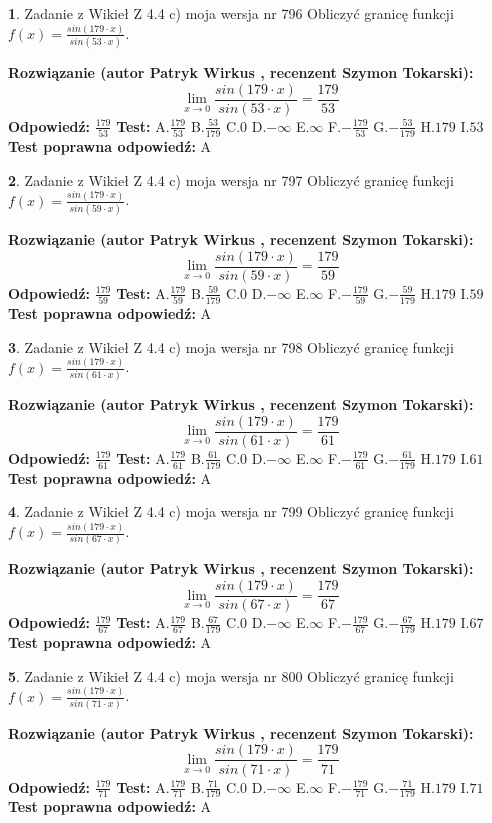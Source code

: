 \documentclass[12pt, a4paper]{article}
\theoremstyle{definition} %
\newtheorem{zad}{}
\newcommand{\zadStart}[1]{\begin{zad}#1\newline}
\newcommand{\zadStop}{\end{zad}}
\newcommand{\rozwStart}[2]{\noindent \textbf{Rozwiązanie (autor #1 , recenzent #2): }\newline}
\newcommand{\rozwStop}{\newline}
\newcommand{\odpStart}{\noindent \textbf{Odpowiedź:}\newline}
\newcommand{\odpStop}{\newline}
\newcommand{\testStart}{\noindent \textbf{Test:}\newline}
\newcommand{\testStop}{\newline}
\newcommand{\kluczStart}{\noindent \textbf{Test poprawna odpowiedź:}\newline}
\newcommand{\kluczStop}{\newline}
\begin{document}
\zadStart{Zadanie z Wikieł Z 4.4 c) moja wersja nr 796}
Obliczyć granicę funkcji $f(x)=\frac{sin(179\cdot x)}{sin(53\cdot x)}$.
\zadStop
\rozwStart{Patryk Wirkus}{Szymon Tokarski}
$$\lim\limits_{x\to 0}\frac{sin(179\cdot x)}{sin(53\cdot x)}=
\frac{179}{53}$$
\rozwStop
\odpStart
$\frac{179}{53}$
\odpStop
\testStart
A.$\frac{179}{53}$
B.$\frac{53}{179}$
C.$0$
D.$-\infty$
E.$\infty$
F.$-\frac{179}{53}$
G.$-\frac{53}{179}$
H.$179$
I.$53$
\testStop
\kluczStart
A
\kluczStop



\zadStart{Zadanie z Wikieł Z 4.4 c) moja wersja nr 797}
Obliczyć granicę funkcji $f(x)=\frac{sin(179\cdot x)}{sin(59\cdot x)}$.
\zadStop
\rozwStart{Patryk Wirkus}{Szymon Tokarski}
$$\lim\limits_{x\to 0}\frac{sin(179\cdot x)}{sin(59\cdot x)}=
\frac{179}{59}$$
\rozwStop
\odpStart
$\frac{179}{59}$
\odpStop
\testStart
A.$\frac{179}{59}$
B.$\frac{59}{179}$
C.$0$
D.$-\infty$
E.$\infty$
F.$-\frac{179}{59}$
G.$-\frac{59}{179}$
H.$179$
I.$59$
\testStop
\kluczStart
A
\kluczStop



\zadStart{Zadanie z Wikieł Z 4.4 c) moja wersja nr 798}
Obliczyć granicę funkcji $f(x)=\frac{sin(179\cdot x)}{sin(61\cdot x)}$.
\zadStop
\rozwStart{Patryk Wirkus}{Szymon Tokarski}
$$\lim\limits_{x\to 0}\frac{sin(179\cdot x)}{sin(61\cdot x)}=
\frac{179}{61}$$
\rozwStop
\odpStart
$\frac{179}{61}$
\odpStop
\testStart
A.$\frac{179}{61}$
B.$\frac{61}{179}$
C.$0$
D.$-\infty$
E.$\infty$
F.$-\frac{179}{61}$
G.$-\frac{61}{179}$
H.$179$
I.$61$
\testStop
\kluczStart
A
\kluczStop



\zadStart{Zadanie z Wikieł Z 4.4 c) moja wersja nr 799}
Obliczyć granicę funkcji $f(x)=\frac{sin(179\cdot x)}{sin(67\cdot x)}$.
\zadStop
\rozwStart{Patryk Wirkus}{Szymon Tokarski}
$$\lim\limits_{x\to 0}\frac{sin(179\cdot x)}{sin(67\cdot x)}=
\frac{179}{67}$$
\rozwStop
\odpStart
$\frac{179}{67}$
\odpStop
\testStart
A.$\frac{179}{67}$
B.$\frac{67}{179}$
C.$0$
D.$-\infty$
E.$\infty$
F.$-\frac{179}{67}$
G.$-\frac{67}{179}$
H.$179$
I.$67$
\testStop
\kluczStart
A
\kluczStop



\zadStart{Zadanie z Wikieł Z 4.4 c) moja wersja nr 800}
Obliczyć granicę funkcji $f(x)=\frac{sin(179\cdot x)}{sin(71\cdot x)}$.
\zadStop
\rozwStart{Patryk Wirkus}{Szymon Tokarski}
$$\lim\limits_{x\to 0}\frac{sin(179\cdot x)}{sin(71\cdot x)}=
\frac{179}{71}$$
\rozwStop
\odpStart
$\frac{179}{71}$
\odpStop
\testStart
A.$\frac{179}{71}$
B.$\frac{71}{179}$
C.$0$
D.$-\infty$
E.$\infty$
F.$-\frac{179}{71}$
G.$-\frac{71}{179}$
H.$179$
I.$71$
\testStop
\kluczStart
A
\kluczStop
\end{document}
